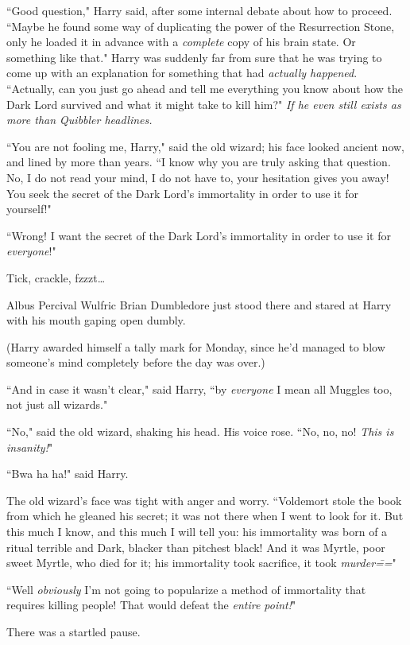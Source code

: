 ``Good question," Harry said, after some internal debate about how to proceed. ``Maybe he found some way of duplicating the power of the Resurrection Stone, only he loaded it in advance with a \emph{complete} copy of his brain state. Or something like that." Harry was suddenly far from sure that he was trying to come up with an explanation for something that had \emph{actually happened}. ``Actually, can you just go ahead and tell me everything you know about how the Dark Lord survived and what it might take to kill him?" \emph{If he even still exists as more than Quibbler headlines.}

``You are not fooling me, Harry," said the old wizard; his face looked ancient now, and lined by more than years. ``I know why you are truly asking that question. No, I do not read your mind, I do not have to, your hesitation gives you away! You seek the secret of the Dark Lord's immortality in order to use it for yourself!"

``Wrong! I want the secret of the Dark Lord's immortality in order to use it for \emph{everyone}!"

\later

Tick, crackle, fzzzt{\ldots}

Albus Percival Wulfric Brian Dumbledore just stood there and stared at Harry with his mouth gaping open dumbly.

(Harry awarded himself a tally mark for Monday, since he'd managed to blow someone's mind completely before the day was over.)

``And in case it wasn't clear," said Harry, ``by \emph{everyone} I mean all Muggles too, not just all wizards."

``No," said the old wizard, shaking his head. His voice rose. ``No, no, no! \emph{This is insanity!}"

``Bwa ha ha!" said Harry.

The old wizard's face was tight with anger and worry. ``Voldemort stole the book from which he gleaned his secret; it was not there when I went to look for it. But this much I know, and this much I will tell you: his immortality was born of a ritual terrible and Dark, blacker than pitchest black! And it was Myrtle, poor sweet Myrtle, who died for it; his immortality took sacrifice, it took \emph{murder\===}"

``Well \emph{obviously} I'm not going to popularize a method of immortality that requires killing people! That would defeat the \emph{entire point!}"

There was a startled pause.

